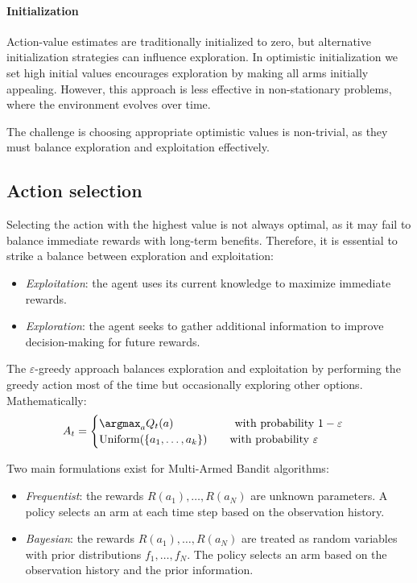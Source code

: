 \paragraph*{Initialization}
Action-value estimates are traditionally initialized to zero, but alternative initialization strategies can influence exploration. 
In optimistic initialization we set high initial values encourages exploration by making all arms initially appealing. 
However, this approach is less effective in non-stationary problems, where the environment evolves over time.

The challenge is choosing appropriate optimistic values is non-trivial, as they must balance exploration and exploitation effectively.

\subsection{Action selection}
Selecting the action with the highest value is not always optimal, as it may fail to balance immediate rewards with long-term benefits. 
Therefore, it is essential to strike a balance between exploration and exploitation:
\begin{itemize}
    \item \textit{Exploitation}: the agent uses its current knowledge to maximize immediate rewards.
    \item \textit{Exploration}: the agent seeks to gather additional information to improve decision-making for future rewards.
\end{itemize}
The $\varepsilon$-greedy approach balances exploration and exploitation by performing the greedy action most of the time but occasionally exploring other options. 
Mathematically:
\[A_t=\begin{cases}
    \argmax_a Q_t(a) \qquad\qquad\quad\:\:\text{with probability }1-\varepsilon\\
    \text{Uniform}(\{a_1,\dots,a_k\})\qquad\text{with probability }\varepsilon
\end{cases}\]

Two main formulations exist for Multi-Armed Bandit algorithms:
\begin{itemize}
    \item \textit{Frequentist}: the rewards $R(a_1), \dots, R(a_N)$ are unknown parameters. 
        A policy selects an arm at each time step based on the observation history.
    \item \textit{Bayesian}: the rewards $R(a_1), \dots, R(a_N)$ are treated as random variables with prior distributions $f_1, \dots, f_N$. 
        The policy selects an arm based on the observation history and the prior information.
\end{itemize}

